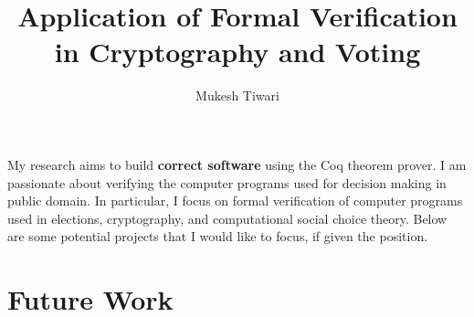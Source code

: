 \documentclass[a4paper]{article}
\title{Application of Formal Verification in Cryptography and Voting}
\author{Mukesh Tiwari}
\date{}
\begin{document}
\fontsize{11}{15}
\selectfont
\maketitle

My research aims to build \textbf{correct software} using the Coq theorem prover. 
I am passionate about verifying the computer programs used for decision making 
in public domain. In particular,
I focus on formal verification of computer programs used in elections, cryptography, 
and computational social choice theory. Below are some potential projects 
that I would like to focus, if given the position.


\section{Future Work}
\end{document}
